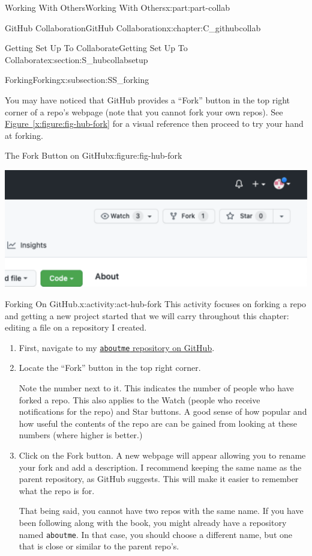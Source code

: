 \documentclass[oneside,10pt,]{book}
\newcommand{\xreffont}{\relax}
\newcommand{\mono}[1]{\texttt{#1}}
\begin{document}
\begin{partptx}{Working With Others}{}{Working With Others}{}{}{x:part:part-collab}
\begin{chapterptx}{GitHub Collaboration}{}{GitHub Collaboration}{}{}{x:chapter:C_githubcollab}
\begin{sectionptx}{Getting Set Up To Collaborate}{}{Getting Set Up To Collaborate}{}{}{x:section:S_hubcollabsetup}
\begin{subsectionptx}{Forking}{}{Forking}{}{}{x:subsection:SS_forking}
\par
You may have noticed that GitHub provides a ``Fork'' button in the top right corner of a repo's webpage (note that you cannot fork your own repos). See \hyperref[x:figure:fig-hub-fork]{Figure~{\xreffont\ref{x:figure:fig-hub-fork}}} for a visual reference then proceed to try your hand at forking.%
\begin{figureptx}{The Fork Button on GitHub}{x:figure:fig-hub-fork}{}%
\begin{image}{0.1}{0.8}{0.1}%
\includegraphics[width=\linewidth]{external/hub_fork.pdf}
\end{image}%
\tcblower
\end{figureptx}%
\begin{activity}{Forking On GitHub.}{x:activity:act-hub-fork}%
This activity focuses on forking a repo and getting a new project started that we will carry throughout this chapter: editing a file on a repository I created.%
\begin{enumerate}[font=\bfseries,label=(\alph*),ref=\alph*]
\item{}First, navigate to my \href{https://github.com/ian-curtis/aboutme}{\mono{aboutme} repository on GitHub}\footnotemark{}.%
\item{}Locate the ``Fork'' button in the top right corner.%
\par
Note the number next to it. This indicates the number of people who have forked a repo. This also applies to the Watch (people who receive notifications for the repo) and Star buttons. A good sense of how popular and how useful the contents of the repo are can be gained from looking at these numbers (where higher is better.)%
\item{}Click on the Fork button. A new webpage will appear allowing you to rename your fork and add a description. I recommend keeping the same name as the parent repository, as GitHub suggests. This will make it easier to remember what the repo is for.%
\par
That being said, you cannot have two repos with the same name. If you have been following along with the book, you might already have a repository named \mono{aboutme}. In that case, you should choose a different name, but one that is close or similar to the parent repo's.%

\end{enumerate}
\end{activity}
\end{subsectionptx}
\end{sectionptx}
\end{chapterptx}
\end{partptx}
\end{document}
